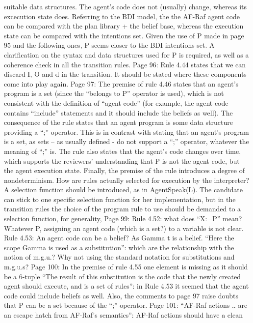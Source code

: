 \documentclass{article}
\begin{document}
suitable data structures. The agent's code does not (usually) change, whereas its excecution state
does. Referring to the BDI model, the the AF-Raf agent code can be compared with the plan library +
the belief base, whereas the execution state can be compared with the intentions set. Given the use
of P made in page 95 and the following ones, P seems closer to the BDI intentions set. A clarification
on the syntax and data structures used for P is required, as well as a coherence check in all the
transition rules.
Page 96:
Rule 4.44 states that we can discard I, O and d in the transition. It should be stated where these
components come into play again.
Page 97:
The premise of rule 4.46 states that an agent's program is a set (since the “belongs to P” operator is
used), which is not consistent with the definition of “agent code” (for example, the agent code
contains “include” statements and it should include the beliefs as well). The consequence of the rule
states that an agent program is some data structure providing a “;” operator. This is in contrast with
stating that an agent's program is a set, as sets – as usually defined - do not support a “;” operator,
whatever the meaning of “;” is. The rule also states that the agent's code changes over time, which
supports the reviewers' understanding that P is not the agent code, but the agent execution state.
Finally, the premise of the rule introduces a degree of nondeterminism. How are rules actually
selected for execution by the interpreter? A selection function should be introduced, as in
AgentSpeak(L). The candidate can stick to one specific selection function for her implementation, but
in the transition rules the choice of the program rule to use should be demanded to a selection
function, for generality,
Page 99:
Rule 4.52: what does “X:=P” mean? Whatever P, assigning an agent code (which is a set?) to a
variable is not clear.
Rule 4.53:
An agent code can be a belief? As Gamma t is a belief.
“Here the scope Gamma is used as a substitution”: which are the relationship with the notion of
m.g.u.? Why not using the standard notation for substitutions and m.g.u.s?
Page 100:
In the premise of rule 4.55 one element is missing as it should be a 6-tuple
“The result of this substitution is the code that the newly created agent should execute, and is a set
of rules”: in Rule 4.53 it seemed that the agent code could include beliefs as well. Also, the
comments to page 97 raise doubts that P can be a set because of the “;” operator.
Page 101:
“AF-Raf actions .. are an escape hatch from AF-Raf's semantics”: AF-Raf actions should have a clean
\end{document}
